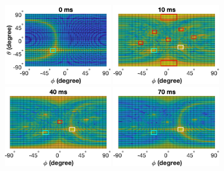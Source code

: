 \begin{figure}[h]
     \begin{minipage}[t]{0.205\textwidth}
     \centering
         \includegraphics[width=\textwidth,height=3.5cm]{Figures/1LC_transition_3D.pdf}
   \end{minipage}
   \begin{minipage}[t]{0.19\textwidth}
     \centering
         \includegraphics[width=\textwidth,height=3.5cm]{Figures/2LC_transition_3D.pdf}
   \end{minipage}
   \begin{minipage}[t]{0.19\textwidth}
     \centering
         \includegraphics[width=\textwidth,height=3.5cm]{Figures/3LC_transition_3D.pdf}
   \end{minipage}
   \begin{minipage}[t]{0.19\textwidth}
     \centering
         \includegraphics[width=\textwidth,height=3.5cm]{Figures/4LC_transition_3D.pdf}
   \end{minipage}
   \begin{minipage}[t]{0.205\textwidth}

\end{minipage}
\end{figure}
